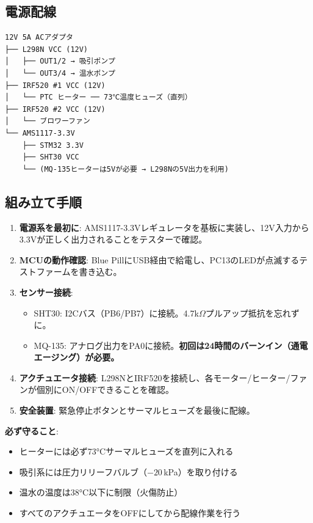 \documentclass[a4paper,11pt]{article}
\begin{document}
\subsection{電源配線}

\begin{verbatim}
12V 5A ACアダプタ
├── L298N VCC (12V)
│   ├── OUT1/2 → 吸引ポンプ
│   └── OUT3/4 → 温水ポンプ
├── IRF520 #1 VCC (12V)
│   └── PTC ヒーター ── 73℃温度ヒューズ（直列）
├── IRF520 #2 VCC (12V)
│   └── ブロワーファン
└── AMS1117-3.3V
    ├── STM32 3.3V
    ├── SHT30 VCC
    └── (MQ-135ヒーターは5Vが必要 → L298Nの5V出力を利用)
\end{verbatim}

\subsection{組み立て手順}

\begin{enumerate}[leftmargin=2em]
  \item \textbf{電源系を最初に}: AMS1117-3.3Vレギュレータを基板に実装し、12V入力から3.3Vが正しく出力されることをテスターで確認。
  \item \textbf{MCUの動作確認}: Blue PillにUSB経由で給電し、PC13のLEDが点滅するテストファームを書き込む。
  \item \textbf{センサー接続}:
    \begin{itemize}
      \item SHT30: I2Cバス（PB6/PB7）に接続。4.7k$\Omega$プルアップ抵抗を忘れずに。
      \item MQ-135: アナログ出力をPA0に接続。\textbf{初回は24時間のバーンイン（通電エージング）が必要。}
    \end{itemize}
  \item \textbf{アクチュエータ接続}: L298NとIRF520を接続し、各モーター/ヒーター/ファンが個別にON/OFFできることを確認。
  \item \textbf{安全装置}: 緊急停止ボタンとサーマルヒューズを最後に配線。
\end{enumerate}

\begin{warningbox}
\textbf{必ず守ること}:
\begin{itemize}[leftmargin=1.5em]
  \item ヒーターには必ず73°Cサーマルヒューズを直列に入れる
  \item 吸引系には圧力リリーフバルブ（$-20$\,kPa）を取り付ける
  \item 温水の温度は38°C以下に制限（火傷防止）
  \item すべてのアクチュエータをOFFにしてから配線作業を行う
\end{itemize}
\end{warningbox}
\end{document}
